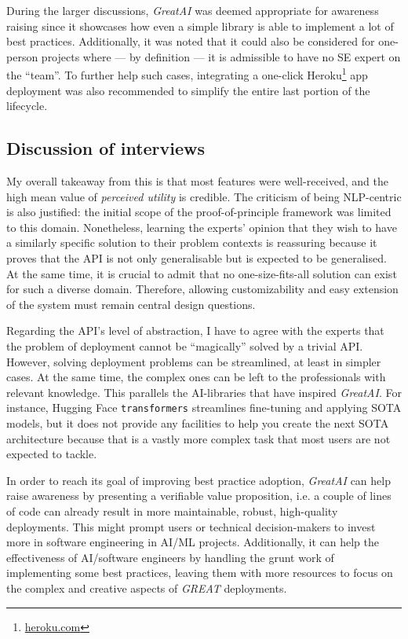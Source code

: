 During the larger discussions, \textit{GreatAI} was deemed appropriate for awareness raising since it showcases how even a simple library is able to implement a lot of best practices. Additionally, it was noted that it could also be considered for one-person projects where --- by definition --- it is admissible to have no SE expert on the ``team''. To further help such cases, integrating a one-click Heroku\footnote{\href{https://www.heroku.com/}{heroku.com}} app deployment was also recommended to simplify the entire last portion of the lifecycle. 

\subsection{Discussion of interviews}

My overall takeaway from this is that most features were well-received, and the high mean value of \textit{perceived utility} is credible. The criticism of being NLP-centric is also justified: the initial scope of the proof-of-principle framework was limited to this domain. Nonetheless, learning the experts' opinion that they wish to have a similarly specific solution to their problem contexts is reassuring because it proves that the API is not only generalisable but is expected to be generalised. At the same time, it is crucial to admit that no one-size-fits-all solution can exist for such a diverse domain. Therefore, allowing customizability and easy extension of the system must remain central design questions.

Regarding the API's level of abstraction, I have to agree with the experts that the problem of deployment cannot be ``magically'' solved by a trivial API. However, solving deployment problems can be streamlined, at least in simpler cases. At the same time, the complex ones can be left to the professionals with relevant knowledge. This parallels the AI-libraries that have inspired \textit{GreatAI}. For instance, Hugging Face \texttt{transformers} streamlines fine-tuning and applying SOTA models, but it does not provide any facilities to help you create the next SOTA architecture because that is a vastly more complex task that most users are not expected to tackle.

In order to reach its goal of improving best practice adoption, \textit{GreatAI} can help raise awareness by presenting a verifiable value proposition, i.e. a couple of lines of code can already result in more maintainable, robust, high-quality deployments. This might prompt users or technical decision-makers to invest more in software engineering in AI/ML projects. Additionally, it can help the effectiveness of AI/software engineers by handling the grunt work of implementing some best practices, leaving them with more resources to focus on the complex and creative aspects of \textit{GREAT} deployments.
  
